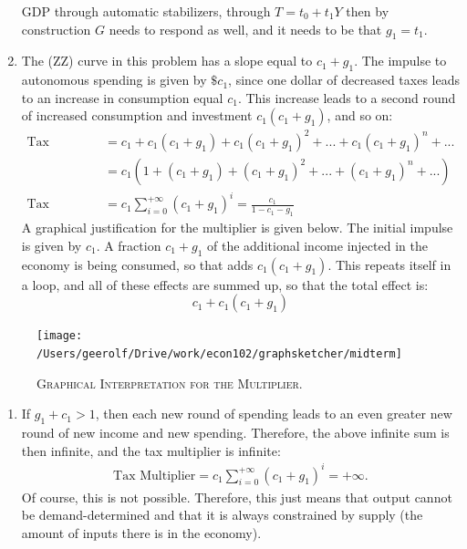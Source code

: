 \documentclass[]{book}
\providecommand{\tightlist}{%
  \setlength{\itemsep}{0pt}\setlength{\parskip}{0pt}}
\begin{document}
\begin{enumerate}
  GDP through automatic stabilizers, through \(T=t_0+t_1 Y\) then by
  construction \(G\) needs to respond as well, and it needs to be that
  \(g_1 = t_1\).
\item
  The (ZZ) curve in this problem has a slope equal to \(c_1+g_1\). The
  impulse to autonomous spending is given by \(\$ c_1\), since one
  dollar of decreased taxes leads to an increase in consumption equal
  \(c_1\). This increase leads to a second round of increased
  consumption and investment \(c_1(c_1+g_1)\), and so on: \[
  \begin{aligned}
  \text{Tax Multiplier} &= c_1 + c_1(c_1+g_1) + c_1(c_1+g_1)^2 + ... + c_1(c_1+g_1)^n + ...\\
  &= c_1\left(1 + (c_1+g_1) + (c_1+g_1)^2 + ... + (c_1+g_1)^n + ...\right) \\
  \text{Tax Multiplier} &=c_1 \sum_{i=0}^{+\infty}(c_1+g_1)^i =  \frac{c_1}{1-c_1-g_1}
  \end{aligned}
  \] A graphical justification for the multiplier is given below. The
  initial impulse is given by \(c_1\). A fraction \(c_1+g_1\) of the
  additional income injected in the economy is being consumed, so that
  adds \(c_1(c_1+g_1)\). This repeats itself in a loop, and all of these
  effects are summed up, so that the total effect is:
  \[c_1 + c_1(c_1+g_1)\]
\end{enumerate}




\begin{figure}

{\centering \texttt{[image: /Users/geerolf/Drive/work/econ102/graphsketcher/midterm]} 

}

\caption{\textsc{Graphical Interpretation for the
Multiplier}.}\label{fig:graphical-multiplier}
\end{figure}

\begin{enumerate}
\def\labelenumi{\arabic{enumi}.}
\setcounter{enumi}{4}
\tightlist
\item
  If \(g_1+c_1>1\), then each new round of spending leads to an even
  greater new round of new income and new spending. Therefore, the above
  infinite sum is then infinite, and the tax multiplier is infinite: \[
  \begin{aligned}
  \text{Tax Multiplier} =c_1 \sum_{i=0}^{+\infty}(c_1+g_1)^i = +\infty.
  \end{aligned}
  \] Of course, this is not possible. Therefore, this just means that
  output cannot be demand-determined and that it is always constrained
  by supply (the amount of inputs there is in the economy).
\end{enumerate}
\end{document}
